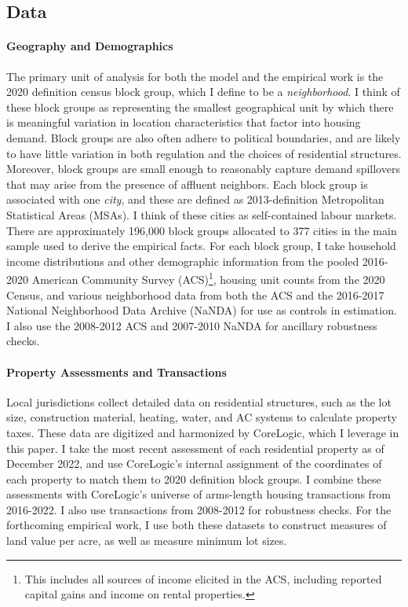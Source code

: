 \documentclass[12pt]{article}
\begin{document}
	\subsection{Data}

	 \paragraph*{Geography and Demographics} The primary unit of analysis for both the model and the empirical work is the 2020 definition census block group, which I define to be a \textit{neighborhood}. I think of these block groups as representing the smallest geographical unit by which there is meaningful variation in location characteristics that factor into housing demand. Block groups are also often adhere to political boundaries, and are likely to have little variation in both regulation and the choices of residential structures. Moreover, block groups are small enough to reasonably capture demand spillovers that may arise from the presence of affluent neighbors. Each block group is associated with one \textit{city}, and these are defined as 2013-definition Metropolitan Statistical Areas (MSAs). I think of these cities as self-contained labour markets. There are approximately 196,000 block groups allocated to 377 cities in the main sample used to derive the empirical facts. For each block group, I take household income distributions and other demographic information from the pooled 2016-2020 American Community Survey (ACS)\footnote{This includes all sources of income elicited in the ACS, including reported capital gains and income on rental properties.},  housing unit counts from the 2020 Census, and various neighborhood data from both the ACS and the 2016-2017 National Neighborhood Data Archive (NaNDA) for use as controls in estimation. I also use the 2008-2012 ACS and 2007-2010 NaNDA for ancillary robustness checks.    
	 
	 \paragraph*{Property Assessments and Transactions} Local jurisdictions collect detailed data on residential structures, such as the lot size, construction material, heating, water, and AC systems to calculate property taxes. These data are digitized and harmonized by CoreLogic, which I leverage in this paper. I take the most recent assessment of each residential property as of December 2022, and use CoreLogic's internal assignment of the coordinates of each property to match them to 2020 definition block groups. I combine these assessments with CoreLogic's universe of arms-length housing transactions from 2016-2022. I also use transactions from 2008-2012 for robustness checks. For the forthcoming empirical work, I use both these datasets to construct measures of land value per acre, as well as measure minimum lot sizes.
	  
\end{document}
